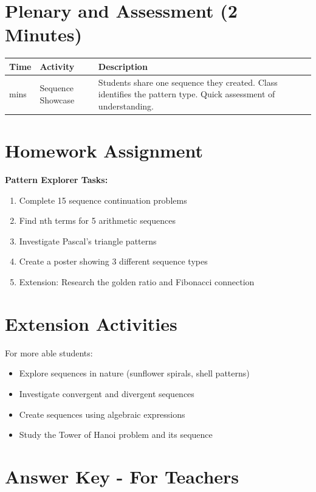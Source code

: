 \documentclass{article}
\begin{document}
\section{Plenary and Assessment (2 Minutes)}

\begin{tabularx}{\textwidth}{|>{\raggedright\arraybackslash}p{1cm}|>{\raggedright\arraybackslash}p{3cm}|>{\raggedright\arraybackslash}X|}
\hline
\textbf{Time} & \textbf{Activity} & \textbf{Description} \\
\hline
2 mins & Sequence Showcase & Students share one sequence they created. Class identifies the pattern type. Quick assessment of understanding. \\
\hline
\end{tabularx}

\section{Homework Assignment}

\textbf{Pattern Explorer Tasks:}
\begin{enumerate}
    \item Complete 15 sequence continuation problems
    \item Find nth terms for 5 arithmetic sequences  
    \item Investigate Pascal's triangle patterns
    \item Create a poster showing 3 different sequence types
    \item Extension: Research the golden ratio and Fibonacci connection
\end{enumerate}

\section{Extension Activities}

For more able students:
\begin{itemize}
    \item Explore sequences in nature (sunflower spirals, shell patterns)
    \item Investigate convergent and divergent sequences
    \item Create sequences using algebraic expressions
    \item Study the Tower of Hanoi problem and its sequence
\end{itemize}

\newpage

\section*{Answer Key - For Teachers}
\end{document}
